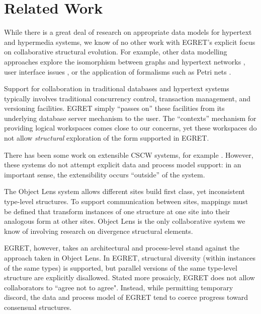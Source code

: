
\section{Related Work}

While there is a great deal of research on appropriate data models for hypertext and hypermedia systems, we know of no other work with EGRET's explicit focus on collaborative structural evolution.  For example, other data modelling approaches explore the isomorphism between graphs and hypertext networks \cite{Anderegg90,Tompa89}, user interface issues \cite{Akscyn88}, or the application of formalisms such as Petri nets \cite{Stotts89}.

Support for collaboration in traditional databases and hypertext systems typically involves traditional concurrency control, transaction management, and versioning facilities. EGRET simply ``passes on'' these facilities from its underlying database server mechanism to the user.  The ``contexts'' mechanism \cite{Delisle87} for providing logical workspaces comes close to our concerns, yet these workspaces do not allow {\em structural}\/ exploration of the form supported in EGRET.

There has been some work on extensible CSCW systems, for example \cite{Mackay90Patterns,Shepherd90Strudel}. However, these systems do not attempt explicit data and process model support: in an important sense, the extensibility occurs ``outside'' of the system.

The Object Lens system \cite{Lee90Partially} allows different sites build first class, yet inconsistent type-level structures.  To support communication between sites, mappings must be defined that transform instances of one structure at one site into their analogous form at other sites.  Object Lens is the only collaborative system we know of involving research on divergence structural elements.

EGRET, however, takes an architectural and process-level stand against the approach taken in Object Lens.  In EGRET, structural diversity (within instances of the same types) is supported, but parallel versions of the same type-level structure are explicitly disallowed.  Stated more prosaicly, EGRET does not allow collaborators to ``agree not to agree".  Instead, while permitting temporary discord, the data and process model of EGRET tend to coerce progress toward consensual structures.

